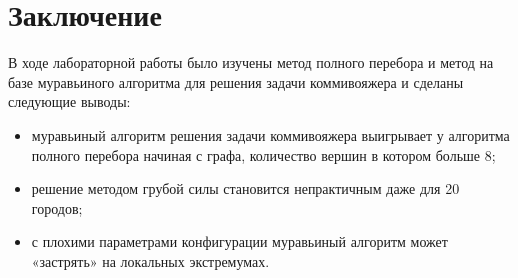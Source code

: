 \chapter*{Заключение}

В ходе лабораторной работы было изучены
метод полного перебора и метод на базе муравьиного алгоритма для решения задачи коммивояжера
и сделаны следующие выводы:

\begin{itemize}
    \item муравьиный алгоритм решения задачи коммивояжера выигрывает
    у алгоритма полного перебора начиная с графа, количество вершин в котором больше 8;
    \item решение методом грубой силы становится непрактичным даже для 20 городов;
    \item с плохими параметрами конфигурации муравьиный алгоритм может «застрять» на локальных экстремумах.
\end{itemize}
